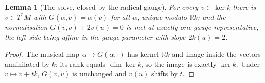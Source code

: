 \documentclass[11pt]{article}
\newtheorem{lemma}[theorem]{Lemma}
\theoremstyle{definition}
\theoremstyle{plain}
\providecommand{\R}{}\renewcommand{\R}{\mathbb{R}}
\begin{document}
\begin{lemma}[The solve, closed by the radical gauge]\label{c:sheaf.solve-closed-radical-gauge}
For every $v \in \ker k$ there is $\tilde v \in T^*M$ with $G(\alpha, \tilde v) = \alpha(v)$ for all $\alpha$, unique modulo $\R k$; and the normalisation $G(\tilde v, \tilde v) + 2\tilde v(u) = 0$ is met at exactly one gauge representative, the left side being affine in the gauge parameter with slope $2k(u) = 2$.
\end{lemma}
\begin{proof}
The musical map $\alpha \mapsto G(\alpha, \cdot)$ has kernel $\R k$ and image inside the vectors annihilated by $k$; its rank equals $\dim\ker k$, so the image is exactly $\ker k$. Under $\tilde v \mapsto \tilde v + tk$, $G(\tilde v, \tilde v)$ is unchanged and $\tilde v(u)$ shifts by $t$.

\end{proof}
\end{document}

